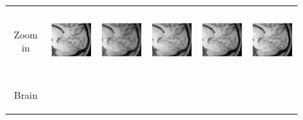 \documentclass[review]{elsarticle}
\begin{document}
\begin{figure}[H]
\begin{raggedleft}
\begin{tabular}{cccccc}
			\tabularnewline
			
			\multirow{1}{0.05cm}[1.3cm]{\begin{turn}{90} {\footnotesize Zoom in} \end{turn}} &
			
			\includegraphics[width=2.5cm,height=2.5cm]{include/grp2/factor4/012-HH-1211-T1/012-HH-1211-T1_images__zoom_35} &
			\includegraphics[width=2.5cm,height=2.5cm]{include/grp2/factor4/012-HH-1211-T1/012-HH-1211-T1_images__zeroPadding_zoom_35} & 
			\includegraphics[width=2.5cm,height=2.5cm]{include/grp2/factor4/012-HH-1211-T1/012-HH-1211-T1_images__CS_zoom_35} & \includegraphics[width=2.5cm,height=2.5cm]{include/grp2/factor4/012-HH-1211-T1/012-HH-1211-T1_images__IMCNNL2TUNE_zoom_35} & \includegraphics[width=2.5cm,height=2.5cm]{include/grp2/factor4/012-HH-1211-T1/012-HH-1211-T1_images__predict_zoom_35}
			
			\tabularnewline
			
			\multirow{2}{0.05cm}[1.4cm]{\begin{turn}{90} {\footnotesize Brain} \end{turn}} & 
			

\end{tabular}
\end{raggedleft}
\end{figure}
\end{document}
